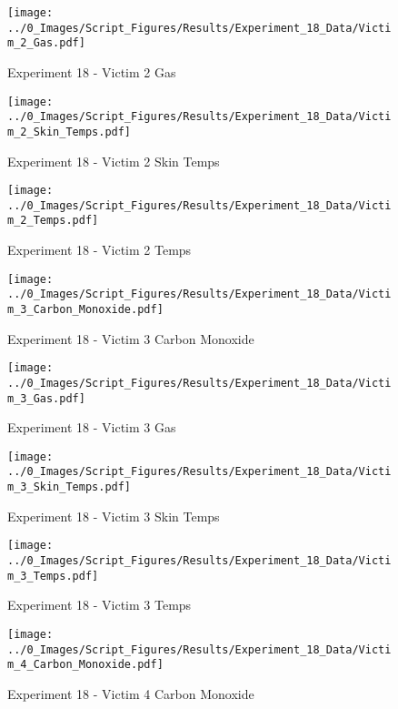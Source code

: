 	\clearpage

	\begin{figure}[H]
		\centering
		\texttt{[image: ../0\_Images/Script\_Figures/Results/Experiment\_18\_Data/Victim\_2\_Gas.pdf]}
		\caption[]{Experiment 18 - Victim 2 Gas}
	\end{figure}
 

	\begin{figure}[H]
		\centering
		\texttt{[image: ../0\_Images/Script\_Figures/Results/Experiment\_18\_Data/Victim\_2\_Skin\_Temps.pdf]}
		\caption[]{Experiment 18 - Victim 2 Skin Temps}
	\end{figure}
 
	\clearpage

	\begin{figure}[H]
		\centering
		\texttt{[image: ../0\_Images/Script\_Figures/Results/Experiment\_18\_Data/Victim\_2\_Temps.pdf]}
		\caption[]{Experiment 18 - Victim 2 Temps}
	\end{figure}
 

	\begin{figure}[H]
		\centering
		\texttt{[image: ../0\_Images/Script\_Figures/Results/Experiment\_18\_Data/Victim\_3\_Carbon\_Monoxide.pdf]}
		\caption[]{Experiment 18 - Victim 3 Carbon Monoxide}
	\end{figure}
 
	\clearpage

	\begin{figure}[H]
		\centering
		\texttt{[image: ../0\_Images/Script\_Figures/Results/Experiment\_18\_Data/Victim\_3\_Gas.pdf]}
		\caption[]{Experiment 18 - Victim 3 Gas}
	\end{figure}
 

	\begin{figure}[H]
		\centering
		\texttt{[image: ../0\_Images/Script\_Figures/Results/Experiment\_18\_Data/Victim\_3\_Skin\_Temps.pdf]}
		\caption[]{Experiment 18 - Victim 3 Skin Temps}
	\end{figure}
 
	\clearpage

	\begin{figure}[H]
		\centering
		\texttt{[image: ../0\_Images/Script\_Figures/Results/Experiment\_18\_Data/Victim\_3\_Temps.pdf]}
		\caption[]{Experiment 18 - Victim 3 Temps}
	\end{figure}
 

	\begin{figure}[H]
		\centering
		\texttt{[image: ../0\_Images/Script\_Figures/Results/Experiment\_18\_Data/Victim\_4\_Carbon\_Monoxide.pdf]}
		\caption[]{Experiment 18 - Victim 4 Carbon Monoxide}
	\end{figure}
 
